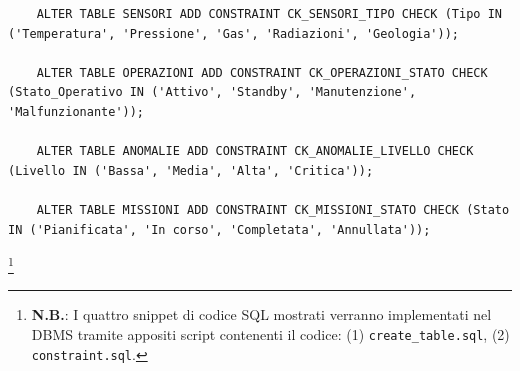 \begin{lstlisting}
    ALTER TABLE SENSORI ADD CONSTRAINT CK_SENSORI_TIPO CHECK (Tipo IN ('Temperatura', 'Pressione', 'Gas', 'Radiazioni', 'Geologia'));
    
    ALTER TABLE OPERAZIONI ADD CONSTRAINT CK_OPERAZIONI_STATO CHECK (Stato_Operativo IN ('Attivo', 'Standby', 'Manutenzione', 'Malfunzionante'));
    
    ALTER TABLE ANOMALIE ADD CONSTRAINT CK_ANOMALIE_LIVELLO CHECK (Livello IN ('Bassa', 'Media', 'Alta', 'Critica'));
    
    ALTER TABLE MISSIONI ADD CONSTRAINT CK_MISSIONI_STATO CHECK (Stato IN ('Pianificata', 'In corso', 'Completata', 'Annullata'));
\end{lstlisting}



\renewcommand{\thefootnote}{}
\noindent
\footnote{\textbf{N.B.}: I quattro snippet di codice SQL mostrati verranno implementati nel DBMS tramite appositi script contenenti il codice: (1) \texttt{create\_table.sql}, (2) \texttt{constraint.sql}.}
\renewcommand{\thefootnote}{\arabic{footnote}}


